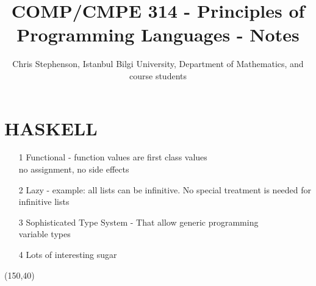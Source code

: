\documentclass{article}
\begin{document}
\title{COMP/CMPE 314 - Principles of Programming Languages - Notes}
\author{Chris Stephenson, Istanbul Bilgi University, Department of Mathematics, and course students}
\maketitle

\section*{HASKELL}
\begin{itemize}
 \item[1] Functional - function values are first class values\\
  no  assignment, no side effects
  \item[2] Lazy - example: all lists can be infinitive. No special treatment is needed for infinitive lists
  \item[3] Sophisticated Type System - That allow generic programming\\
  variable types
  \item[4] Lots of interesting sugar
\end{itemize}
 \begin{flushleft}
 \framebox(150,40){}
 \end{flushleft}
 
\end{document}
